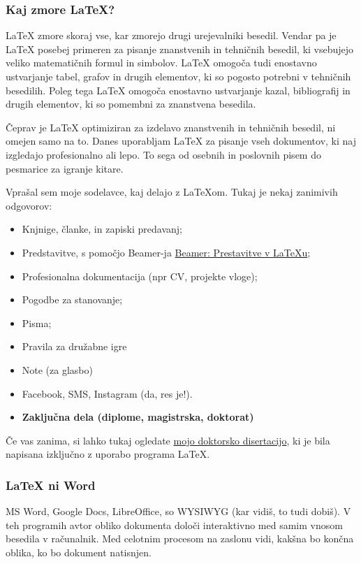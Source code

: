 \subsubsection{Kaj zmore LaTeX?}\label{latexUvod_KajZmoreLaTeX}

LaTeX zmore skoraj vse, kar zmorejo drugi urejevalniki besedil.
Vendar pa je LaTeX posebej primeren za pisanje znanstvenih in tehničnih besedil, ki vsebujejo veliko matematičnih formul in simbolov.
LaTeX omogoča tudi enostavno ustvarjanje tabel, grafov in drugih elementov, ki so pogosto potrebni v tehničnih besedilih.
Poleg tega LaTeX omogoča enostavno ustvarjanje kazal, bibliografij in drugih elementov, ki so pomembni za znanstvena besedila.

Čeprav je LaTeX optimiziran za izdelavo znanstvenih in tehničnih besedil, ni omejen samo na to. Danes uporabljam LaTeX za pisanje vseh dokumentov, ki naj izgledajo profesionalno ali lepo.
To sega od osebnih in poslovnih pisem do pesmarice za igranje kitare.

Vprašal sem moje sodelavce, kaj delajo z LaTeXom.
Tukaj je nekaj zanimivih odgovorov:

\begin{itemize}
\item Knjnige, članke, in zapiski predavanj;
\item Predstavitve, s pomočjo Beamer-ja \href{/latexbeamer}{Beamer: Prestavitve v LaTeXu};
\item Profesionalna dokumentacija (npr CV, projekte vloge);
\item Pogodbe za stanovanje;
\item Pisma;
\item Pravila za družabne igre
\item Note (za glasbo)
\item Facebook, SMS, Instagram (da, res je!).
\item \textbf{Zaključna dela (diplome, magistrska, doktorat)}
\end{itemize}

Če vas zanima, si lahko tukaj ogledate \href{https://anteromontonio.github.io/assets/pdf/2019\_Mon\_phDThesis.pdf}{mojo doktorsko disertacijo}, ki je bila napisana izključno z uporabo programa LaTeX.

\subsubsection{LaTeX ni Word}\label{latexUvod_latexNiWord}

MS Word, Google Docs, LibreOffice, so WYSIWYG (kar vidiš, to tudi dobiš).
V teh programih avtor obliko dokumenta določi interaktivno med samim vnosom besedila v računalnik. Med celotnim procesom na zaslonu vidi, kakšna bo končna oblika, ko bo dokument natisnjen.


